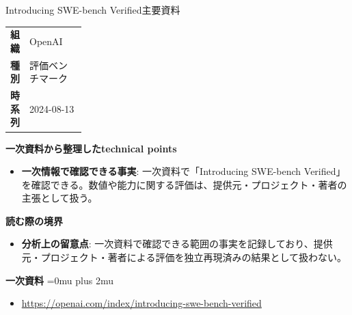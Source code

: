 \begin{technicalnote}{Introducing SWE-bench Verified}{主要資料}
\begingroup
\begin{tabularx}{\linewidth}{@{}>{\bfseries}p{0.22\linewidth}X@{}}
組織 & OpenAI \\
種別 & 評価ベンチマーク \\
時系列 & 2024-08-13 \\
\end{tabularx}
\smallskip
{\bfseries 一次資料から整理したtechnical points}
\begin{itemize}[leftmargin=1.5em,itemsep=0.35em]
\item \textbf{一次情報で確認できる事実}: 一次資料で「Introducing SWE-bench Verified」を確認できる。数値や能力に関する評価は、提供元・プロジェクト・著者の主張として扱う。
\end{itemize}
\begin{minipage}{\linewidth}
{\bfseries 読む際の境界}
\begin{itemize}[leftmargin=1.5em,itemsep=0.35em]
\item \textbf{分析上の留意点}: 一次資料で確認できる範囲の事実を記録しており、提供元・プロジェクト・著者による評価を独立再現済みの結果として扱わない。
\end{itemize}
\begin{samepage}
{\bfseries 一次資料}
\begingroup\sloppy
\Urlmuskip=0mu plus 2mu\relax
\begin{itemize}[leftmargin=1.5em,itemsep=0.25em]
\item {\scriptsize\url{https://openai.com/index/introducing-swe-bench-verified}}
\end{itemize}
\endgroup
\end{samepage}
\end{minipage}
\endgroup
\end{technicalnote}
\medskip

